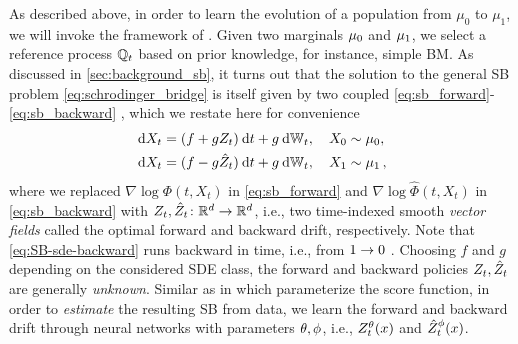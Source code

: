 As described above, in order to learn the evolution of a population from $\mu_0$ to $\mu_1$, we will invoke the framework of .
Given two marginals $\mu_0$ and $\mu_1$, we select a reference process $\mathbb{Q}_{ t }$ based on prior knowledge, for instance, simple \acrlong{BM}. As discussed in \cref{sec:background_sb}, it turns out that  the solution to the general \acrshort{SB} problem \eqref{eq:schrodinger_bridge} is itself given by two coupled  \eqref{eq:sb_forward}-\eqref{eq:sb_backward} \citep{leonard2013survey}, which we restate here for convenience
\begin{eqnarray}
\label{eq:SB-sde-forward}
\dsde &= \parens*{\tdriftbase +  \volatbase \SBfbase_\ctime} \dt + \volatbase \dWiener[\ctime],\quad \sde[0] \sim \distinit, \\ %
\label{eq:SB-sde-backward}
\dsde &= \parens{\tdriftbase -  \volatbase \SBbbase_\ctime} \dt + \volatbase \dWiener[\ctime],\quad \sde[\horizon] \sim \distend\,, %
\end{eqnarray}
where we replaced $\nabla \log \Phi\left(t, X_t\right)$ in \eqref{eq:sb_forward} and $\nabla \log \widehat{\Phi}\left(t, X_t\right)$ in \eqref{eq:sb_backward} with $Z_t, \hat{Z}_t \colon \mathbb{R}^d \to \mathbb{R}^d$, i.e., two time-indexed smooth \emph{vector fields} called the optimal forward and backward drift, respectively. Note that \eqref{eq:SB-sde-backward} runs backward in time, i.e., from $1 \to 0$ \citep{anderson1982reverse}. %
Choosing $f$ and $g$ depending on the considered SDE class, the forward and backward policies $Z_t, \hat{Z}_t$ are generally \emph{unknown}.
Similar as in  \citep{song2020score, hyvarinen2005estimation} which parameterize the score function, in order to \emph{estimate} the resulting \acrshort{SB} from data, we learn the forward and backward drift through neural networks with parameters $\theta, \phi$, i.e., $\SBf$ and $\SBb$. \\

